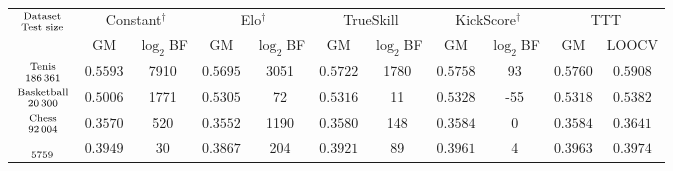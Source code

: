\documentclass[a4paper,10pt]{book}
\newcommand\hfrac[2]{\genfrac{}{}{0pt}{}{#1}{#2}} %
\theoremstyle{definition}
\newif\ifen
\newif\ifes
\newcommand{\en}[1]{\ifen#1\fi}
\newcommand{\es}[1]{\ifes#1\fi}
\begin{document}
\begin{table}[ht!] \centering
  \scriptsize
  \begin{tabular}{c|cc|cc|cc|cc|c||c} 
 \multirow{2}{*}{$\hfrac{\text{\scriptsize Dataset}}{\text{Test size}}$} & \multicolumn{2}{c|}{Constant\es{e}$^\dagger$}& \multicolumn{2}{c|}{Elo$^\dagger$} & \multicolumn{2}{c|}{TrueSkill} & \multicolumn{2}{c|}{KickScore$^\dagger$} &  \multicolumn{2}{c}{TTT} \\
 & GM & $\log_2$BF & GM & $\log_2$BF & GM & $\log_2$BF & GM & $\log_2$BF & GM & LOOCV \\ \hline
\multirow{2}{*}{$\hfrac{\text{\scriptsize Ten\en{n}is}}{\num{186361}}$} & \multirow{2}{*}{$0.5593$} & \multirow{2}{*}{\num{7910}} & \multirow{2}{*}{$0.5695$} & \multirow{2}{*}{\num{3051}} & \multirow{2}{*}{$0.5722$} & \multirow{2}{*}{\num{1780}} & \multirow{2}{*}{$0.5758$} & \multirow{2}{*}{\num{93}} & \multirow{2}{*}{$\bm{0.5760}$} & \multirow{2}{*}{${0.5908}$} \\
 & & & & & & & & & & \\
 \multirow{2}{*}{$\hfrac{\text{\scriptsize Basketball}}{\num{20300}}$} & \multirow{2}{*}{$0.5006$} & \multirow{2}{*}{\num{1771}} & \multirow{2}{*}{$0.5305$} & \multirow{2}{*}{\num{72}} & \multirow{2}{*}{$0.5316$} & \multirow{2}{*}{\num{11}} & \multirow{2}{*}{$\bm{0.5328}$} & \multirow{2}{*}{-55} & \multirow{2}{*}{${0.5318}$} & \multirow{2}{*}{${0.5382}$} \\
  & & & & & & & & & & \\
 \multirow{2}{*}{$\hfrac{\text{\scriptsize Chess}}{\num{92004}}$} & \multirow{2}{*}{$0.3570$} & \multirow{2}{*}{\num{520}} & \multirow{2}{*}{$0.3552$} & \multirow{2}{*}{\num{1190}} & \multirow{2}{*}{$0.3580$} & \multirow{2}{*}{\num{148}} & \multirow{2}{*}{$\bm{0.3584}$} & \multirow{2}{*}{0} & \multirow{2}{*}{$\bm{0.3584}$} & \multirow{2}{*}{${0.3641}$} \\
 & & & & & & & & & \\
 \multirow{2}{*}{$\hfrac{\text{\scriptsize \en{Football}\es{Fútbol}}}{\num{5759}}$} & \multirow{2}{*}{$0.3949$} & \multirow{2}{*}{\num{30}} & \multirow{2}{*}{$0.3867$} & \multirow{2}{*}{\num{204}} & \multirow{2}{*}{$0.3921$} & \multirow{2}{*}{\num{89}} & \multirow{2}{*}{$\bm{0.3961}$} & \multirow{2}{*}{\num{4}} & \multirow{2}{*}{$\bm{0.3963}$} &  \multirow{2}{*}{${0.3974}$} \\
  & & & & & & & & & & \\ \hline
  \end{tabular}
  \caption{
  \en{Comparisons between different models in four databases. }%
}
\end{table}
\end{document}
